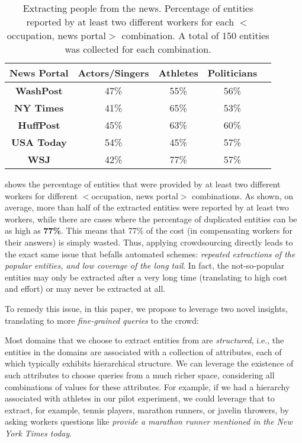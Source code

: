\vspace{10pt}\begin{table}[h]
\center
\vspace{-10pt}
\caption{Extracting people from the news. Percentage of entities reported by at least two different workers for each $<$occupation, news portal$>$ combination. A total of 150 entities was collected for each combination.}
\label{tab:duplicates}
\begin{tabular}{|c|c|c|c|c|}
\hline
News Portal & {\bf Actors/Singer}s & {\bf Athletes} & \textbf{Politicians}\\ \hline
{\bf WashPost} & 47\% & 55\% & 56\% \\
{\bf NY Times} & 41\%& 65\% & 53\% \\
{\bf HuffPost} & 45\% & 63\% & 60\% \\
{\bf USA Today} & 54\% & 45\% & 57\% \\
{\bf WSJ} & 42\% & 77\% & 57\% \\
\hline
\end{tabular}
\end{table}

\noindent {} shows the percentage of entities that were provided by at 
least two different workers for different $<$occupation, news portal$>$ 
combinations. 
As shown, on average, more than half of the extracted entities were reported by at least two workers, 
while there are cases where the percentage of duplicated entities can be as high as {\bf 77\%}. 
This means that 77\% of the cost (in compensating workers for their answers) is simply wasted. 
Thus, applying crowdsourcing directly leads to the 
exact same issue that befalls automated schemes: 
{\em repeated extractions of the popular entities, and low coverage of the long tail}.
In fact, the not-so-popular entities may only be extracted after a very long time
(translating to high cost and effort) or may never be extracted at all.

 To remedy this issue, in this paper, we propose to 
leverage two novel insights, translating to more {\em fine-grained
queries} to the crowd:

Most domains that we choose to extract entities from are {\em structured}, i.e., 
the entities in the domains are associated with a collection of attributes, 
each of which typically exhibits hierarchical structure. 
We can leverage the existence of such attributes to choose queries from a much richer space, 
considering all combinations of values for these attributes.
For example, if we had a hierarchy associated with athletes in our
pilot experiment, we could
leverage that to extract, for example, tennis players, marathon runners,
or javelin throwers, by asking workers questions like {\em provide a marathon runner mentioned
in the New York Times today}.

